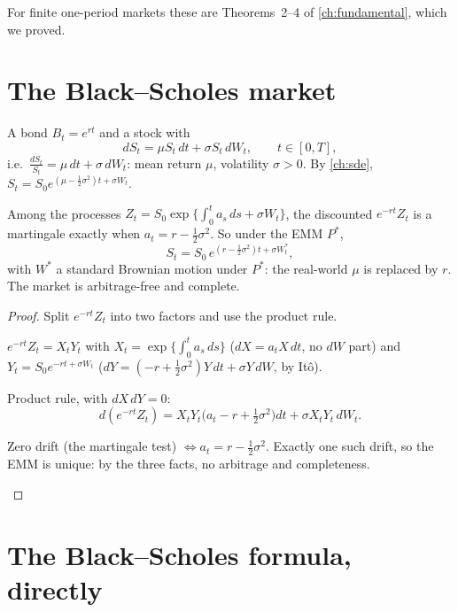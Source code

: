 For finite one-period markets these are Theorems~2--4 of \cref{ch:fundamental}, which we proved.

\section{The Black--Scholes market}

\begin{setup}
A bond $B_t=e^{rt}$ and a stock with
\[
  dS_t=\mu S_t\,dt+\sigma S_t\,dW_t,\qquad t\in[0,T],
\]
i.e.\ $\frac{dS_t}{S_t}=\mu\,dt+\sigma\,dW_t$: mean return $\mu$, volatility $\sigma>0$. By \cref{ch:sde}, $S_t=S_0e^{(\mu-\frac12\sigma^2)t+\sigma W_t}$.
\end{setup}

\begin{theorem}
\label{thm:bs-emm}
Among the processes $Z_t=S_0\exp\big\{\int_0^ta_s\,ds+\sigma W_t\big\}$, the discounted $e^{-rt}Z_t$ is a martingale exactly when $a_t=r-\frac12\sigma^2$. So under the EMM $P^*$,
\[
  S_t=S_0\,e^{(r-\frac12\sigma^2)t+\sigma W^*_t},
\]
with $W^*$ a standard Brownian motion under $P^*$: the real-world $\mu$ is replaced by $r$. The market is arbitrage-free and complete.
\end{theorem}
\begin{proof}
Split $e^{-rt}Z_t$ into two factors and use the product rule.
\begin{steps}
  \item $e^{-rt}Z_t=X_tY_t$ with $X_t=\exp\{\int_0^ta_s\,ds\}$ ($dX=a_tX\,dt$, no $dW$ part) and $Y_t=S_0e^{-rt+\sigma W_t}$ ($dY=(-r+\frac12\sigma^2)Y\,dt+\sigma Y\,dW$, by Itô).
  \item Product rule, with $dX\,dY=0$:
  \[
    d(e^{-rt}Z_t)=X_tY_t\big(a_t-r+\tfrac12\sigma^2\big)dt+\sigma X_tY_t\,dW_t .
  \]
  \item Zero drift (the martingale test) $\iff a_t=r-\frac12\sigma^2$. Exactly one such drift, so the EMM is unique: by the three facts, no arbitrage and completeness. \qedhere
\end{steps}
\end{proof}

\section{The Black--Scholes formula, directly}

